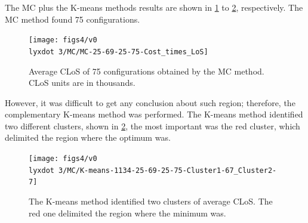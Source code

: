 The MC plus the K-means methods results are shown in \ref{subfig:mc4-3}
to \ref{subfig:km4-3}, respectively. The MC method found 75 configurations.
\begin{figure}[H]
\centering{}\texttt{[image: figs4/v0\\lyxdot 3/MC/MC-25-69-25-75-Cost\_times\_LoS]}\caption{Average CLoS of 75 configurations obtained by the MC method. CLoS
units are in thousands. \label{subfig:mc4-3}}
\end{figure}
However, it was difficult to get any conclusion about such region;
therefore, the complementary K-means method was performed. The K-means
method identified two different clusters, shown in \ref{subfig:km4-3},
the most important was the red cluster, which delimited the region
where the optimum was. %

\begin{figure}[H]
\begin{centering}
\texttt{[image: figs4/v0\\lyxdot 3/MC/K-means-1134-25-69-25-75-Cluster1-67\_Cluster2-7]}
\par\end{centering}

\caption{The K-means method identified two clusters of average CLoS. The red
one delimited the region where the minimum was. \label{subfig:km4-3}}
\end{figure}



